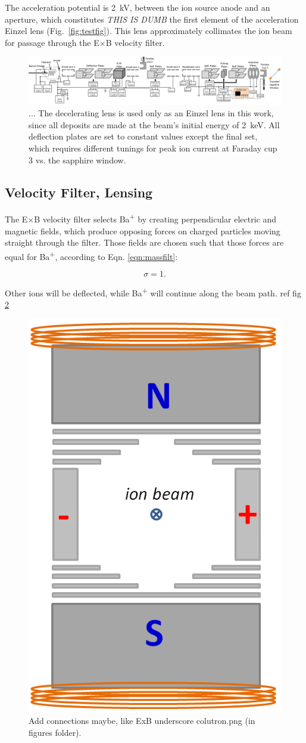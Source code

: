 The acceleration potential is 2~kV, between the ion source anode and an aperture, which constitutes \emph{THIS IS DUMB} the first element of the acceleration Einzel lens (Fig.~\ref{fig:testfig}).  This lens approximately collimates the ion beam for passage through the E$\times$B velocity filter.

\begin{figure}[H]
        \centering
                \includegraphics[width=1.\textwidth]{figures/ionBeam.png}
                \caption{ ... The decelerating lens is used only as an Einzel lens in this work, since all deposits are made at the beam's initial energy of 2~keV.  All deflection plates are set to constant values except the final set, which requires different tunings for peak ion current at Faraday cup 3 vs. the sapphire window.}
\label{fig:ionbeam}
\end{figure}

\subsection{Velocity Filter, Lensing}

The E$\times$B velocity filter selects Ba\textsuperscript{+} by creating perpendicular electric and magnetic fields, which produce opposing forces on charged particles moving straight through the filter.  Those fields are chosen such that those forces are equal for Ba\textsuperscript{+}, according to Eqn. \ref{eqn:massfilt}:

\begin{equation}
\sigma = 1.
\label{eqn:massfilt}
\end{equation}

\noindent
Other ions will be deflected, while Ba\textsuperscript{+} will continue along the beam path.  ref fig \ref{fig:exb}

\begin{figure}[H]
        \centering
                \includegraphics[width=.3\textwidth]{figures/ExB.png}
                \caption{{\color{red}Add connections maybe, like ExB underscore colutron.png (in figures folder).}}
\label{fig:exb}
\end{figure}

